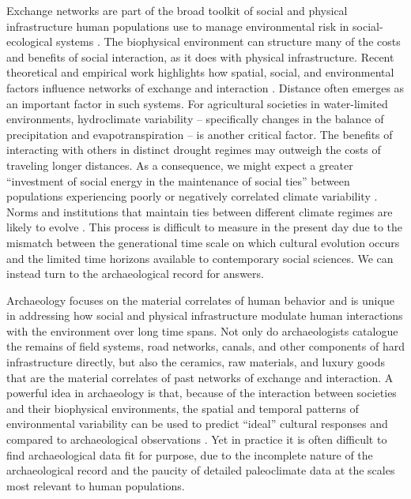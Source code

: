 \documentclass[10pt]{iopart}
\begin{document}
Exchange networks are part of the broad toolkit of social and physical infrastructure human populations use to manage environmental risk in social-ecological systems \parencite{Anderies2015}. The biophysical environment can structure many of the costs and benefits of social interaction, as it does with physical infrastructure. Recent theoretical and empirical work highlights how spatial, social, and environmental factors influence networks of exchange and interaction \parencite{Fafchamps2007,Bloch2008,Nolin2010,Verdery2012,Freeman2014,Koster2014,Hao2015a,Schnegg2015}. Distance often emerges as an important factor in such systems. For agricultural societies in water-limited environments, hydroclimate variability -- specifically changes in the balance of precipitation and evapotranspiration -- is another critical factor. The benefits of interacting with others in distinct drought regimes may outweigh the costs of traveling longer distances. As a consequence, we might expect a greater ``investment of social energy in the maintenance of social ties'' between populations experiencing poorly or negatively correlated climate variability \parencite{Rautman1993a}. Norms and institutions that maintain ties between different climate regimes are likely to evolve \parencite{Durante2009}. This process is difficult to measure in the present day due to the mismatch between the generational time scale on which cultural evolution occurs and the limited time horizons available to contemporary social sciences. We can instead turn to the archaeological record for answers. 

Archaeology focuses on the material correlates of human behavior and is unique in addressing how social and physical infrastructure modulate human interactions with the environment over long time spans. Not only do archaeologists catalogue the remains of field systems, road networks, canals, and other components of hard infrastructure directly, but also the ceramics, raw materials, and luxury goods that are the material correlates of past networks of exchange and interaction. A powerful idea in archaeology is that, because of the interaction between societies and their biophysical environments, the spatial and temporal patterns of environmental variability can be used to predict ``ideal'' cultural responses and compared to archaeological observations \parencite{Halstead1989}. Yet in practice it is often difficult to find archaeological data fit for purpose, due to the incomplete nature of the archaeological record and the paucity of detailed paleoclimate data at the scales most relevant to human populations. 
\end{document}
